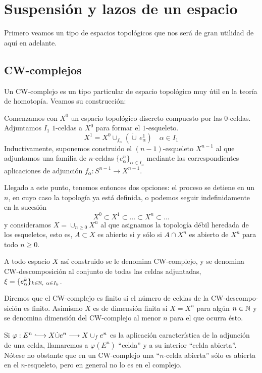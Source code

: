 \chapter{Suspensión y lazos de un espacio}
Primero veamos un tipo de espacios topológicos que nos será de gran utilidad de aquí en adelante.
\section{CW-complejos}
Un CW-complejo es un tipo particular de espacio topológico muy útil en la teoría de homotopía. Veamos su construcción: \par
Comenzamos con $X^0$ un espacio topológico discreto compuesto por las $0$-celdas. Adjuntamos $I_1$ $1$-celdas a $X^0$ para formar el $1$-esqueleto.
\[ X^1 = X^0 \cup_{f_\alpha} \left( \dot{\cup} \, e_\alpha^1 \right) \quad \alpha \in I_1\]
Inductivamente, suponemos construido el $(n-1)$-esqueleto $X^{n-1}$ al que adjuntamos una familia de $n$-celdas $\{e_\alpha^n\}_{\alpha \in I_n}$ mediante las correspondientes aplicaciones de adjunción $f_\alpha : S^{n-1} \longrightarrow X^{n-1}$. \par 
Llegado a este punto, tenemos entonces dos opciones: el proceso se detiene en un $n$, en cuyo caso la topología ya está definida, o podemos seguir indefinidamente en la sucesión
\[ X^0 \subset X^1 \subset \ldots \subset X^n \subset \ldots \]
y consideramos $\displaystyle X = \cup_{n \geq 0} X^n $ al que asignamos la topología débil heredada de los esqueletos, esto es, $A \subset X$ es abierto si y sólo si $A \cap X^n$ es abierto de $X^n$ para todo $n \geq 0$. \par 
A todo espacio $X$ así construido se le denomina CW-complejo, y se denomina CW-descomposición al conjunto de todas las celdas adjuntadas, $\xi = \{e^k_\alpha\}_{k \in \mathbb{N}, \ \alpha \in I_k}$. \par
Diremos que el CW-complejo es finito si el número de celdas de la CW-descompo-sición es finito. Asimismo $X$ es de dimensión finita si $X = X^n$ para algún $n \in \mathbb{N}$ y se denomina dimensión del CW-complejo al menor $n$ para el que ocurra ésto. \par
Si $\varphi : E^n \longhookrightarrow X \dot{\cup} e^n \longrightarrow X \cup_f e^n$ es la aplicación característica de la adjunción de una celda, llamaremos a $\varphi(E^n)$ ``celda'' y a su interior ``celda abierta''. Nótese no obstante que en un CW-complejo una ``$n$-celda abierta'' sólo es abierta en el $n$-esqueleto, pero en general no lo es en el complejo.
